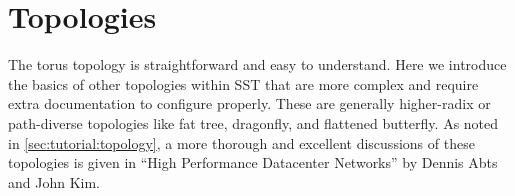 
\chapter{Topologies}
\label{chapter:topologies}


The torus topology is straightforward and easy to understand.
Here we introduce the basics of other topologies within SST that are more complex and require extra documentation to configure properly.
These are generally higher-radix or path-diverse topologies like fat tree, dragonfly, and flattened butterfly.  
As noted in \ref{sec:tutorial:topology}, a more thorough and excellent discussions of these topologies is given in ``High Performance Datacenter Networks'' by Dennis Abts and John Kim.

%
%
%
%
%
%
%
%
%








